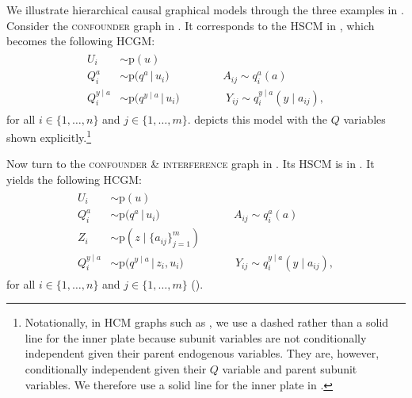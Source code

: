 \documentclass[12pt]{article}
\newcommand{\pr}{\mathrm{p}}
\begin{document}
We illustrate hierarchical causal graphical models through the three examples in . Consider the \textsc{confounder} graph in .  It corresponds to the HSCM in , which becomes the following HCGM:
\begin{align}
  \label{eqn:hcgm_confound}
  \begin{split}
    U_i &\sim \pr(u)\\
    Q^{a}_i &\sim \pr\big(q^{a} \, \big|\, u_i \big) \,\,\,\,\,\,\,\,\,\,\,\,\,\,\,\,\,\,\,\,\,\,\,\,\,\,\,\,\, A_{ij} \sim q_i^{a}(a)\\
    Q^{y \mid a}_i &\sim \pr\big (q^{y\mid a}\, \big|\, u_i\big)\,\,\,\,\,\,\,\,\,\,\,\,\,\,\,\,\,\,\,\,\,\,\,\,\, Y_{ij} \sim q_i^{y\mid a}(y \mid a_{ij}),
  \end{split}
\end{align}
for all $i \in \{1, \ldots, n\}$ and $j \in \{1, \ldots, m\}$.  depicts this model with the $Q$ variables shown explicitly.\footnote{Notationally, in HCM graphs such as , we use a dashed rather than a solid line for the inner plate because subunit variables are not conditionally independent given their parent endogenous variables. They are, however, conditionally independent given their $Q$ variable and parent subunit variables. We therefore use a solid line for the inner plate in .}


Now turn to the \textsc{confounder \& interference} graph in . Its HSCM is in . It yields the following HCGM:
\begin{align} \label{eqn:hcgm_interfere}
  \begin{split}
    U_i &\sim \pr(u)\\
    Q^{a}_i &\sim \pr\big(q^{a} \, \big|\, u_i \big) \,\,\,\,\,\,\,\,\,\,\,\,\,\,\,\,\,\,\,\,\,\,\,\,\,\,\,\,\,\,\,\,\,\,\,\,\,\,\,\, A_{ij} \sim q_i^{a}(a)\\
    Z_i &\sim \pr(z \mid \{a_{ij}\}_{j=1}^m)\\
    Q^{y\mid a}_i &\sim \pr\big (q^{y\mid a}\, \big|\, z_i, u_i\big)\,\,\,\,\,\,\,\,\,\,\,\,\,\,\,\,\,\,\,\,\,\,\,\,\,\,\,\, Y_{ij} \sim q_i^{y \mid a}(y \mid a_{ij}),
  \end{split}
\end{align}
for all $i \in \{1, \ldots, n\}$ and $j \in \{1, \ldots, m\}$ ().
\end{document}
